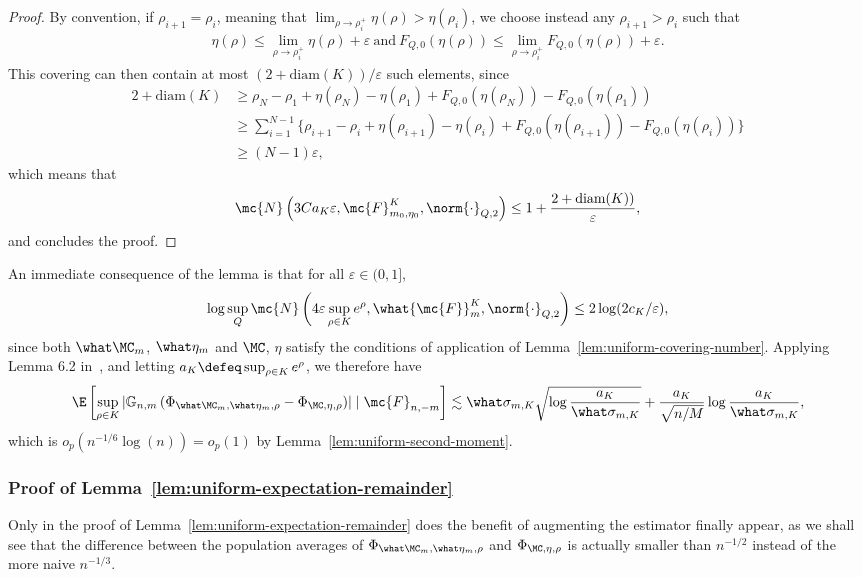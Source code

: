 \begin{proof}
By convention, if $\rho_{i+1} = \rho_i$,  meaning that $\lim_{\rho \to \rho_i^+} \eta(\rho) > \eta(\rho_i)$,  we choose instead any $\rho_{i+1} > \rho_i$ such that
\begin{align*}
\eta(\rho)\le \lim_{\rho \to \rho_i^+} \eta(\rho) + \varepsilon 
~\text{and} ~
F_{Q,0}(\eta(\rho)) \le \lim_{\rho \to \rho_i^+} F_{Q,0}(\eta(\rho)) + \varepsilon.
\end{align*}
This covering can then contain at most $(2+ \textrm{diam}(K)) / \varepsilon$ such elements,  
since
\begin{align*}
2+ \textrm{diam}(K) &\ge \rho_N - \rho_1 + \eta(\rho_{N}) - \eta(\rho_1) + F_{Q,0}(\eta(\rho_{N})) - F_{Q,0}(\eta(\rho_1))  \\
&\ge 
\sum_{i=1}^{N-1} \big\{
\rho_{i+1} - \rho_i + \eta(\rho_{i+1}) - \eta(\rho_i) + F_{Q,0}(\eta(\rho_{i+1})) - F_{Q,0}(\eta(\rho_i)) \big\} \\
&\ge (N-1)\varepsilon,
\end{align*}
 which means that
\begin{align*}
\mc{N} \left(3Ca_K \varepsilon,  \mc{F}_{m_0,\eta_0}^K, \norm{\cdot}_{Q,2} \right) \le 1+\frac{2+ \textrm{diam}(K))}{ \varepsilon},
\end{align*}
and concludes the proof.
\end{proof}
An immediate consequence of the lemma is that for all $\varepsilon \in (0,1]$,
\begin{align*}
\log \sup_Q \mc{N} \left(4 \varepsilon \sup_{\rho \in K} e^{\rho},  \what{\mc{F}}_m^K,  \norm{\cdot}_{Q,2} \right) \le 2 \log(2c_K/\varepsilon),
\end{align*}
since both $\what \MC_m$, $\what \eta_m$ and $\MC$, $\eta$ satisfy the conditions of application of Lemma~\ref{lem:uniform-covering-number}.
Applying Lemma 6.2 in~\citet{ChernozhukovChDeDuHaNeRo16},  and letting $a_K \defeq \sup_{\rho\in K} e^\rho$,  we therefore have
\begin{align*}
\E\left[ \sup_{\rho \in K} \left|  \mathbb{G}_{n,m}\left( \Phi_{\what \MC_m, \what \eta_m, \rho} - \Phi_{\MC,  \eta, \rho} \right) \right| \mid \mc{F}_{n,-m} \right] \lesssim \what \sigma_{m,K}\sqrt{\log \frac{a_K}{\what \sigma_{m,K}}} + \frac{a_K}{\sqrt{n/M}}\log \frac{a_K}{\what \sigma_{m,K}},
\end{align*}
which is $o_p(n^{-1/6}\log(n)) = o_p(1)$ by Lemma~\ref{lem:uniform-second-moment}.

\subsubsection{Proof of Lemma~\ref{lem:uniform-expectation-remainder}}
Only in the proof of Lemma~\ref{lem:uniform-expectation-remainder} does the benefit of augmenting the estimator finally appear, as we shall see that the difference between the population averages of $\Phi_{\what \MC_m, \what \eta_m, \rho}$  and $\Phi_{\MC,  \eta, \rho}$ is actually smaller than $n^{-1/2}$ instead of the more naive $n^{-1/3}$.


